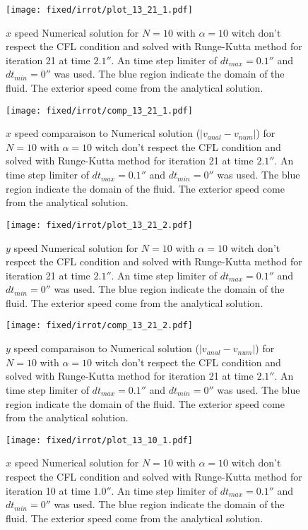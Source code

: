\begin{figure}
\texttt{[image: fixed/irrot/plot\_13\_21\_1.pdf]}
\caption{$x$ speed Numerical solution for $N=10$ with $\alpha=10$ witch don't respect the CFL condition and solved with Runge-Kutta method
for iteration 21 at time $\unit{2.1}{\second}$.
An time step limiter of $dt_{max}=\unit{0.1}{\second}$ and $dt_{min}=\unit{0}{\second}$ was used.
The blue region indicate the domain of the fluid. The exterior speed come from the analytical solution.
\label{fix:plot_13_21_1}
}
\end{figure}

\begin{figure}
\texttt{[image: fixed/irrot/comp\_13\_21\_1.pdf]}
\caption{$x$ speed comparaison to Numerical solution ($|v_{anal}-v_{num}|$) for $N=10$ with $\alpha=10$ witch don't respect the CFL condition and solved with Runge-Kutta method
for iteration 21 at time $\unit{2.1}{\second}$.
An time step limiter of $dt_{max}=\unit{0.1}{\second}$ and $dt_{min}=\unit{0}{\second}$ was used.
The blue region indicate the domain of the fluid. The exterior speed come from the analytical solution.
\label{fix:comp_13_21_1}
}
\end{figure}

\begin{figure}
\texttt{[image: fixed/irrot/plot\_13\_21\_2.pdf]}
\caption{$y$ speed Numerical solution for $N=10$ with $\alpha=10$ witch don't respect the CFL condition and solved with Runge-Kutta method
for iteration 21 at time $\unit{2.1}{\second}$.
An time step limiter of $dt_{max}=\unit{0.1}{\second}$ and $dt_{min}=\unit{0}{\second}$ was used.
The blue region indicate the domain of the fluid. The exterior speed come from the analytical solution.
\label{fix:plot_13_21_2}
}
\end{figure}


\begin{figure}
\texttt{[image: fixed/irrot/comp\_13\_21\_2.pdf]}
\caption{$y$ speed comparaison to Numerical solution ($|v_{anal}-v_{num}|$) for $N=10$ with $\alpha=10$ witch don't respect the CFL condition and solved with Runge-Kutta method
for iteration 21 at time $\unit{2.1}{\second}$.
An time step limiter of $dt_{max}=\unit{0.1}{\second}$ and $dt_{min}=\unit{0}{\second}$ was used.
The blue region indicate the domain of the fluid. The exterior speed come from the analytical solution.
\label{fix:comp_13_21_2}
}
\end{figure}


\begin{figure}
\texttt{[image: fixed/irrot/plot\_13\_10\_1.pdf]}
\caption{$x$ speed Numerical solution for $N=10$ with $\alpha=10$ witch don't respect the CFL condition and solved with Runge-Kutta method
for iteration 10 at time $\unit{1.0}{\second}$.
An time step limiter of $dt_{max}=\unit{0.1}{\second}$ and $dt_{min}=\unit{0}{\second}$ was used.
The blue region indicate the domain of the fluid. The exterior speed come from the analytical solution.
\label{fix:plot_13_10_1}
}
\end{figure}

